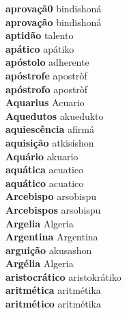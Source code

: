 \textbf{ aprovaçã0  } bindishoná \\
\textbf{ aprovação  } bindishoná \\
\textbf{ aptidão  } talento \\
\textbf{ apático  } apátiko \\
\textbf{ apóstolo  } adherente \\
\textbf{ apóstrofe  } apostròf \\
\textbf{ apóstrofo  } apostròf \\
\textbf{ Aquarius  } Acuario \\
\textbf{ Aquedutos  } akuedukto \\
\textbf{ aquiescência  } afirmá \\
\textbf{ aquisição  } atkisishon \\
\textbf{ Aquário  } akuario \\
\textbf{ aquática  } acuatico \\
\textbf{ aquático  } acuatico \\
\textbf{ Arcebispo  } arsobispu \\
\textbf{ Arcebispos  } arsobispu \\
\textbf{ Argelia  } Algeria \\
\textbf{ Argentina  } Argentina \\
\textbf{ arguição  } akusashon \\
\textbf{ Argélia  } Algeria \\
\textbf{ aristocrático  } aristokrátiko \\
\textbf{ aritmética  } aritmétika \\
\textbf{ aritmético  } aritmétika \\
